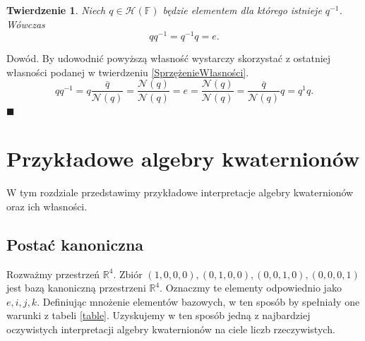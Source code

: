 \documentclass[a4paper,twoside,11pt,reqno]{mwrep}
\theoremstyle{plain} \newtheorem{twr}{Twierdzenie}
\theoremstyle{plain} \newtheorem{lem}{Lemat}
\theoremstyle{definition} \newtheorem{defi}{Definicja}
\theoremstyle{remark} \newtheorem*{wni}{Wniosek}
\theoremstyle{definition} \newtheorem{uwaga}{Uwaga}
\theoremstyle{definition}\newtheorem{prz}{Przykład}
\newenvironment{dowod}{\par\vspace{0.1cm}\par{\sc Dowód.}}{\hfill $\blacksquare$\par\vspace{0.4cm}\par}
\begin{document}
\begin{twr}
Niech $q \in \mathcal{H}\left( \mathbb{F}\right)$ będzie elementem dla którego istnieje $q^{-1}$.
Wówczas $$qq^{-1} = q^{-1}q=e.$$
\end{twr}
\begin{dowod}
By udowodnić powyższą własność wystarczy skorzystać z ostatniej własności podanej w twierdzeniu 
\ref{SprzężenieWłasności}.
$$qq^{-1} =q\frac{\overline{q}}{\mathcal{N}(q)} = \frac{\mathcal{N}(q)}{\mathcal{N}(q)}=e =
\frac{\mathcal{N}(q)}{\mathcal{N}(q)}= \frac{\overline{q}}{\mathcal{N}(q)}q =  q^{1}q. $$
\end{dowod}

\section{Przykładowe algebry kwaternionów}
W tym rozdziale przedstawimy przykładowe interpretacje algebry kwaternionów oraz ich własności.

\subsection{Postać kanoniczna}
Rozważmy przestrzeń $\mathbb{R}^4$. Zbiór ${(1,0,0,0),(0,1,0,0),(0,0,1,0),(0,0,0,1)}$
jest bazą kanoniczną przestrzeni $\mathbb{R}^4$. Oznaczmy te elementy odpowiednio jako $e,i,j,k$.
Definiując mnożenie elementów bazowych, w ten sposób by spełniały one warunki z
tabeli \ref{table}. Uzyskujemy w ten sposób jedną z najbardziej oczywistych interpretacji algebry kwaternionów
na ciele liczb rzeczywistych. %
\end{document}
